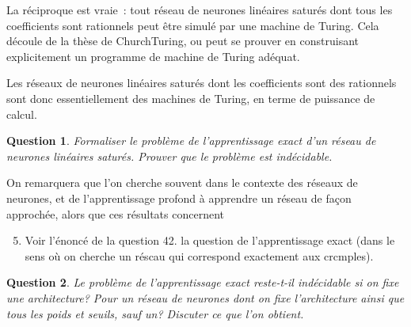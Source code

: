 \documentclass[10pt]{article}
\newtheorem{question}{Question}
\begin{document}
La réciproque est vraie : tout réseau de neurones linéaires saturés dont tous les coefficients sont rationnels peut être simulé par une machine de Turing. Cela découle de la thèse de ChurchTuring, ou peut se prouver en construisant explicitement un programme de machine de Turing adéquat.

Les réseaux de neurones linéaires saturés dont les coefficients sont des rationnels sont donc essentiellement des machines de Turing, en terme de puissance de calcul.

\begin{question}
	Formaliser le problème de l'apprentissage exact d'un réseau de neurones linéaires saturés. Prouver que le problème est indécidable.
\end{question}

On remarquera que l'on cherche souvent dans le contexte des réseaux de neurones, et de l'apprentissage profond à apprendre un réseau de façon approchée, alors que ces résultats concernent

\begin{enumerate}
  \setcounter{enumi}{4}
  \item Voir l'énoncé de la question 42. la question de l'apprentissage exact (dans le sens où on cherche un réscau qui correspond exactement aux crcmples).
\end{enumerate}

\begin{question}
	Le problème de l'apprentissage exact reste-t-il indécidable si on fixe une architecture? Pour un réseau de neurones dont on fixe l'architecture ainsi que tous les poids et seuils, sauf un? Discuter ce que l'on obtient.
\end{question}
\end{document}
